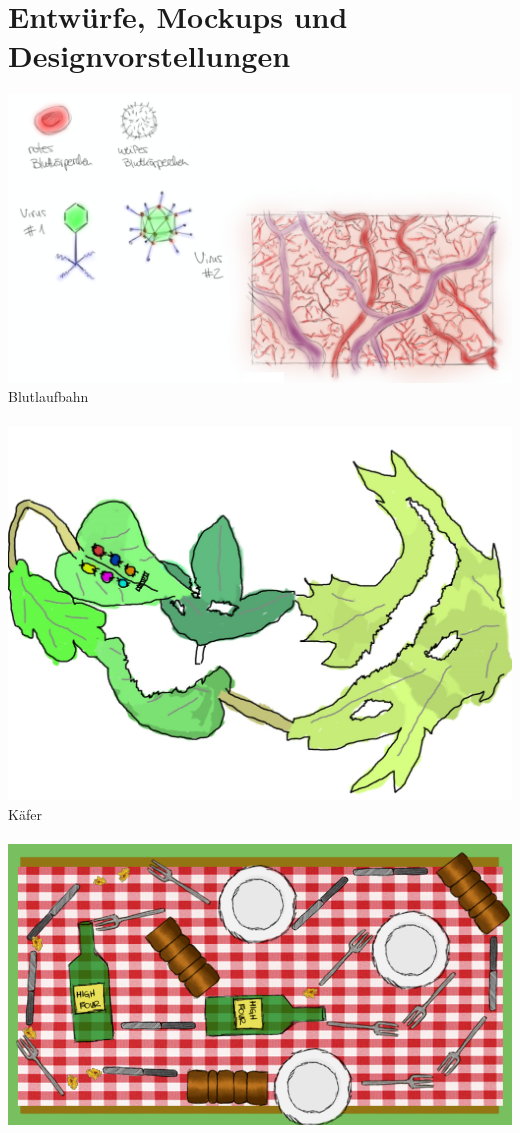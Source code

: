 \section{Entwürfe, Mockups und Designvorstellungen}

\includegraphics[width=1\textwidth]{img/blutlaufbahn.png}
Blutlaufbahn\\
\\
\includegraphics[width=1\textwidth]{img/kaefer.png}
Käfer\\
\\
\includegraphics[width=1\textwidth]{img/picknick.png}
